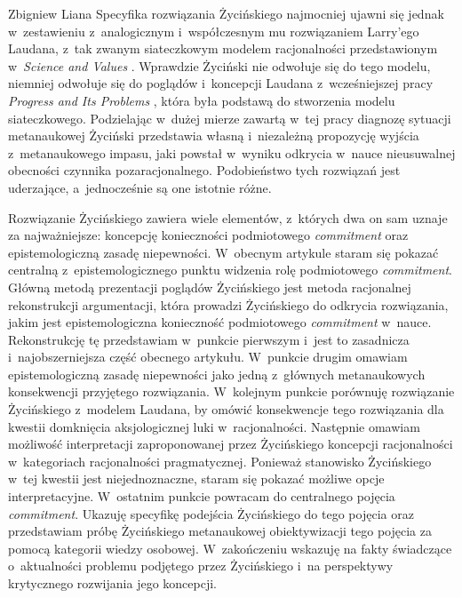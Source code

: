 \begin{artplenv}{Zbigniew Liana}
Specyfika rozwiązania Życińskiego najmocniej ujawni się jednak w~zestawieniu z~analogicznym i~współczesnym mu rozwiązaniem Larry'ego Laudana, z~tak zwanym siateczkowym modelem racjonalności przedstawionym w~\textit{Science and Values}
\parencite*[][]{laudan_science_1984}. %
 Wprawdzie Życiński nie odwołuje się do tego modelu, niemniej odwołuje się do poglądów i~koncepcji Laudana z~wcześniejszej pracy \textit{Progress and Its Problems} 
\parencite*[][]{laudan_progress_1977}, %
 która była podstawą do stworzenia modelu siateczkowego. Podzielając w~dużej mierze zawartą w~tej pracy diagnozę sytuacji metanaukowej Życiński przedstawia własną i~niezależną propozycję wyjścia z~metanaukowego impasu, jaki powstał w~wyniku odkrycia w~nauce nieusuwalnej obecności czynnika pozaracjonalnego. Podobieństwo tych rozwiązań jest uderzające, a~jednocześnie są one istotnie różne.

Rozwiązanie Życińskiego zawiera wiele elementów, z~których dwa on sam uznaje za najważniejsze: koncepcję konieczności podmiotowego \textit{commitment} oraz epistemologiczną zasadę niepewności. W~obecnym artykule staram się pokazać centralną z~epistemologicznego punktu widzenia rolę podmiotowego \textit{commitment}. Główną metodą prezentacji poglądów Życińskiego jest metoda racjonalnej rekonstrukcji argumentacji, która prowadzi Życińskiego do odkrycia rozwiązania, jakim jest epistemologiczna konieczność podmiotowego \textit{commitment} w~nauce. Rekonstrukcję tę przedstawiam w~punkcie pierwszym i~jest to zasadnicza i~najobszerniejsza część obecnego artykułu. W~punkcie drugim omawiam epistemologiczną zasadę niepewności jako jedną z~głównych metanaukowych konsekwencji przyjętego rozwiązania. W~kolejnym punkcie porównuję rozwiązanie Życińskiego z~modelem Laudana, by omówić konsekwencje tego rozwiązania dla kwestii domknięcia aksjologicznej luki w~racjonalności. Następnie omawiam możliwość interpretacji zaproponowanej przez Życińskiego koncepcji racjonalności w~kategoriach racjonalności pragmatycznej. Ponieważ stanowisko Życińskiego w~tej kwestii jest niejednoznaczne, staram się pokazać możliwe opcje interpretacyjne. W~ostatnim punkcie powracam do centralnego pojęcia \textit{commitment}. Ukazuję specyfikę podejścia Życińskiego do tego pojęcia oraz przedstawiam próbę Życińskiego metanaukowej obiektywizacji tego pojęcia za pomocą kategorii wiedzy osobowej. W~zakończeniu wskazuję na fakty świadczące o~aktualności problemu podjętego przez Życińskiego i~na perspektywy krytycznego rozwijania jego \mbox{koncepcji}.


\end{artplenv}
